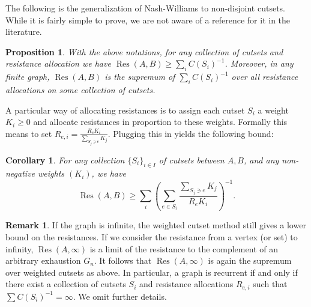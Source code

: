 \documentclass[12pt]{article}
\newtheorem{corollary}[thm]{Corollary}
\newtheorem{prop}[thm]{Proposition}
\theoremstyle{definition}
\newtheorem{remark}[thm]{Remark}
\numberwithin{equation}{section}
\newcommand{\Res}{\operatorname{Res}}
\begin{document}
The following is the generalization of Nash-Williams to non-disjoint cutsets.
While it is fairly simple to prove, we are not aware of a reference for it in the literature.

\begin{prop}\label{P:WNW}
  With the above notations, for any collection of cutsets and resistance allocation we have $\Res(A,B) \geq \sum_i C(S_i)^{-1}$.
  Moreover, in any finite graph, $\Res(A,B)$ is the supremum of $\sum_i C(S_i)^{-1}$ over all resistance allocations on some collection of cutsets.
\end{prop}

A particular way of allocating resistances is to assign each cutset $S_i$ a weight $K_i\ge 0$ and allocate resistances in proportion to these weights.
Formally this means to set $R_{e,i} = \frac{R_e K_i}{\sum_{S_j\ni e} K_j}$.
Plugging this in yields the following bound:

\begin{corollary}
  For any collection $\{S_i\}_{i\in I}$ of cutsets between $A,B$, and any non-negative weights $(K_i)$, we have
  \[
    \Res(A,B) \geq \sum_i \left(
      \sum_{e\in S_i} \frac{\sum_{S_j\ni e} K_j}{R_e K_i} \right)^{-1}.
  \]
\end{corollary}

\begin{remark}
  If the graph is infinite, the weighted cutset method still gives a lower bound on the resistances.
  If we consider the resistance from a vertex (or set) to infinity, $\Res(A,\infty)$ is a limit of the resistance to the complement of an arbitrary exhaustion $G_n$.
  It follows that $\Res(A,\infty)$ is again the supremum over weighted cutsets as above.
  In particular, a graph is recurrent if and only if there exist a collection of cutsets $S_i$ and resistance allocations $R_{e,i}$ such that $\sum C(S_i)^{-1} = \infty$.
  We omit further details.
\end{remark}
\end{document}
